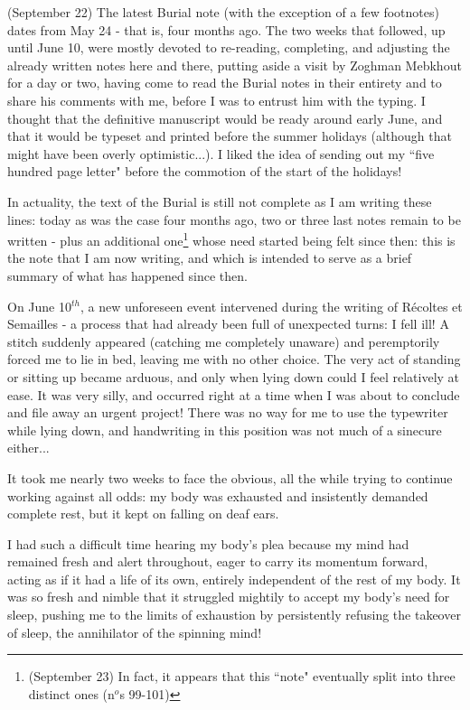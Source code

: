\label{note:98}(September 22) The latest Burial note (with the exception of a few footnotes) dates from May 24 - that is, four months ago. The two weeks that followed, up until June 10, were mostly devoted to re-reading, completing, and adjusting the already written notes here and there, putting aside a visit by Zoghman Mebkhout for a day or two, having come to read the Burial notes in their entirety and to share his comments with me, before I was to entrust him with the typing. I thought that the definitive manuscript would be ready around early June, and that it would be typeset and printed before the summer holidays (although that might have been overly optimistic...). I liked the idea of sending out my ``five hundred page letter" before the commotion of the start of the holidays!

In actuality, the text of the Burial is still not complete as I am writing these lines: today as was the case four months ago, two or three last notes remain to be written - plus an additional one\footnote{(September 23) In fact, it appears that this ``note" eventually split into three distinct ones (n$^o$s 99-101)} whose need started being felt since then: this is the note that I am now writing, and which is intended to serve as a brief summary of what has happened since then. 

On June 10$^{th}$, a new unforeseen event intervened during the writing of R\'ecoltes et Semailles - a process that had already been full of unexpected turns: I fell ill! A stitch suddenly appeared (catching me completely unaware) and peremptorily forced me to lie in bed, leaving me with no other choice. The very act of standing or sitting up became arduous, and only when lying down could I feel relatively at ease. It was very silly, and occurred right at a time when I was about to conclude and file away an urgent project! There was no way for me to use the typewriter while lying down, and handwriting in this position was not much of a sinecure either...

It took me nearly two weeks to face the obvious, all the while trying to continue working against all odds: my body was exhausted and insistently demanded complete rest, but it kept on falling on deaf ears.

I had such a difficult time hearing my body's plea because my mind had remained fresh and alert throughout, eager to carry its momentum forward, acting as if it had a life of its own, entirely independent of the rest of my body. It was so fresh and nimble that it struggled mightily to accept my body's need for sleep, pushing me to the limits of exhaustion by persistently refusing the takeover of sleep, the annihilator of the spinning mind!



